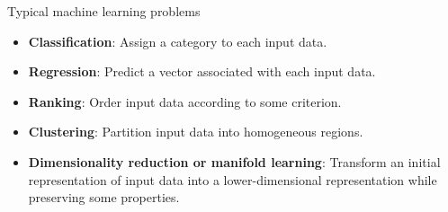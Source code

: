 \documentclass[xcolor={usenames,dvipsnames},handout]{beamer}
\begin{document}
\begin{frame}{Typical machine learning problems}

\begin{itemize}
\item \textbf{Classification}: \alert{Assign a category} to each input data. 

\vspace{.2cm}

\item \textbf{Regression}: \alert{Predict a vector} associated with each input data. 

\vspace{.2cm}

\item \textbf{Ranking}: \alert{Order input data} according to some criterion. 

\vspace{.2cm}

\item \textbf{Clustering}: \alert{Partition input data} into homogeneous regions. %

\vspace{.2cm}

\item \textbf{Dimensionality reduction or manifold learning}: Transform an initial representation of input data into a \alert{lower-dimensional representation}  while preserving some properties. 
\end{itemize}

\end{frame}
\end{document}
